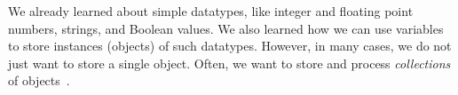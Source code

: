 %
%
We already learned about simple datatypes, like integer and floating point numbers, strings, and Boolean values.
We also learned how we can use variables to store instances (objects) of such datatypes.
However, in many cases, we do not just want to store a single object.
Often, we want to store and process \emph{collections} of objects~\cite{PSF2024BIT,PSF2024DM,PSF2024CAABCFC}.%
%
%
%
%
\endhsection%
%
